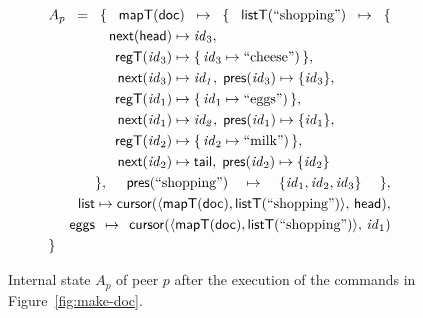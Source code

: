\documentclass[10pt,journal,compsoc]{IEEEtran}
\newcommand{\multialign}[2]{%
  \multispan{#1}\mbox{$\displaystyle{}#2$}%
}
\begin{document}
\begin{figure}
\centering \begin{alignat*}{3}
& \multialign{5}{A_p = \{\; \mathsf{mapT}(\mathsf{doc}) \mapsto \{\;
    \mathsf{listT}(\text{``shopping''}) \mapsto \{ } \\
&&&& \mathsf{next}(\mathsf{head}) & \mapsto \mathit{id}_3, \\
&&&& \mathsf{regT}(\mathit{id}_3) & \mapsto \{\,\mathit{id}_3 \mapsto \text{``cheese''})\,\}, \\
&&&& \mathsf{next}(\mathit{id}_3) & \mapsto \mathit{id_1},\; \mathsf{pres}(\mathit{id}_3) \mapsto \{\mathit{id}_3\}, \\
&&&& \mathsf{regT}(\mathit{id}_1) & \mapsto \{\,\mathit{id}_1 \mapsto \text{``eggs''})\,\}, \\
&&&& \mathsf{next}(\mathit{id}_1) & \mapsto \mathit{id_2},\; \mathsf{pres}(\mathit{id}_1) \mapsto \{\mathit{id}_1\}, \\
&&&& \mathsf{regT}(\mathit{id}_2) & \mapsto \{\,\mathit{id}_2 \mapsto \text{``milk''})\,\}, \\
&&&& \mathsf{next}(\mathit{id}_2) & \mapsto \mathsf{tail},\; \mathsf{pres}(\mathit{id}_2) \mapsto \{\mathit{id}_2\} \\
&&& \multialign{3}{\},\;
    \mathsf{pres}(\text{``shopping''}) \mapsto \{\mathit{id}_1, \mathit{id}_2, \mathit{id}_3\} \;\},} \\
&& \mathsf{list} & \multialign{3}{\mapsto \mathsf{cursor}(\langle \mathsf{mapT}(\mathsf{doc}),%
    \mathsf{listT}(\text{``shopping''})\rangle,\, \mathsf{head}),} \\
&& \mathsf{eggs} & \multialign{3}{\mapsto \mathsf{cursor}(\langle \mathsf{mapT}(\mathsf{doc}),%
    \mathsf{listT}(\text{``shopping''})\rangle,\, \mathit{id}_1)} \\
& \}
\end{alignat*}
\caption{Internal state $A_p$ of peer $p$ after the execution of the commands in Figure~\ref{fig:make-doc}.}\label{fig:state-example}
\end{figure}
\end{document}
